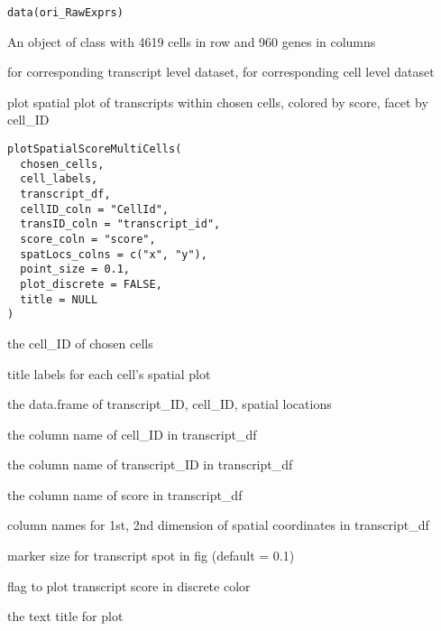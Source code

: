 \documentclass[letterpaper]{book}
\begin{document}
%
\begin{Usage}
\begin{verbatim}
data(ori_RawExprs)
\end{verbatim}
\end{Usage}
%
\begin{Format}
An object of class  with 4619 cells in row and 960 genes in columns
\end{Format}
%
\begin{SeeAlso}
 for corresponding transcript level dataset,  for corresponding cell level dataset
\end{SeeAlso}
%
\begin{Description}
plot spatial plot of transcripts within chosen cells, colored by score, facet by cell\_ID
\end{Description}
%
\begin{Usage}
\begin{verbatim}
plotSpatialScoreMultiCells(
  chosen_cells,
  cell_labels,
  transcript_df,
  cellID_coln = "CellId",
  transID_coln = "transcript_id",
  score_coln = "score",
  spatLocs_colns = c("x", "y"),
  point_size = 0.1,
  plot_discrete = FALSE,
  title = NULL
)
\end{verbatim}
\end{Usage}
%
\begin{Arguments}
\begin{ldescription}
\item[\code{chosen\_cells}] the cell\_ID of chosen cells

\item[\code{cell\_labels}] title labels for each cell's spatial plot

\item[\code{transcript\_df}] the data.frame of transcript\_ID, cell\_ID, spatial locations

\item[\code{cellID\_coln}] the column name of cell\_ID in transcript\_df

\item[\code{transID\_coln}] the column name of transcript\_ID in transcript\_df

\item[\code{score\_coln}] the column name of score in transcript\_df

\item[\code{spatLocs\_colns}] column names for 1st, 2nd dimension of spatial coordinates in transcript\_df

\item[\code{point\_size}] marker size for transcript spot in fig (default = 0.1)

\item[\code{plot\_discrete}] flag to plot transcript score in discrete color

\item[\code{title}] the text title for plot
\end{ldescription}
\end{Arguments}
\end{document}
